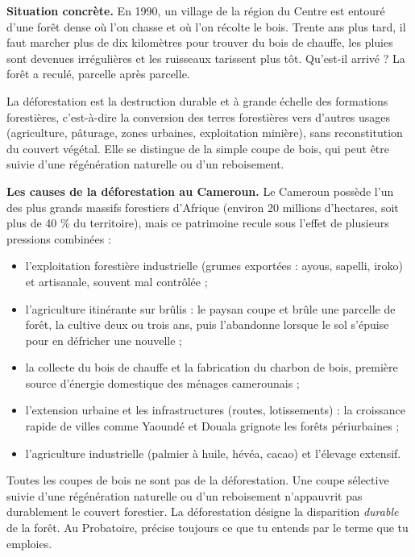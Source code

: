 \documentclass[11pt]{article}
\newcommand{\cle}[1]{{\popxbold\color{popdark}#1}}
\newcounter{popsec}
\newcounter{popsub}
\newcommand{\courssub}[1]{%
  \stepcounter{popsub}%
  \par\vspace{9pt}\noindent{\popxbold\fontsize{11.5}{13}\selectfont\color{popink}{\color{poporange}\thepopsec.\thepopsub}\hspace{6pt}#1}\par\nopagebreak\vspace{4pt}
}
\begin{document}
\courssub{Qu'est-ce que la déforestation ?}

\textbf{Situation concrète.} En 1990, un village de la région du Centre est entouré d'une forêt dense où l'on chasse et où l'on récolte le bois. Trente ans plus tard, il faut marcher plus de dix kilomètres pour trouver du bois de chauffe, les pluies sont devenues irrégulières et les ruisseaux tarissent plus tôt. Qu'est-il arrivé ? La forêt a reculé, parcelle après parcelle.

\begin{definition}[Déforestation]
La \cle{déforestation} est la destruction durable et à grande échelle des formations forestières, c'est-à-dire la conversion des terres forestières vers d'autres usages (agriculture, pâturage, zones urbaines, exploitation minière), sans reconstitution du couvert végétal. Elle se distingue de la simple coupe de bois, qui peut être suivie d'une régénération naturelle ou d'un reboisement.
\end{definition}

\textbf{Les causes de la déforestation au Cameroun.} Le Cameroun possède l'un des plus grands massifs forestiers d'Afrique (environ 20 millions d'hectares, soit plus de 40 \% du territoire), mais ce patrimoine recule sous l'effet de plusieurs pressions combinées :

\begin{itemize}
\item l'\cle{exploitation forestière} industrielle (grumes exportées : ayous, sapelli, iroko) et artisanale, souvent mal contrôlée ;
\item l'\cle{agriculture itinérante sur brûlis} : le paysan coupe et brûle une parcelle de forêt, la cultive deux ou trois ans, puis l'abandonne lorsque le sol s'épuise pour en défricher une nouvelle ;
\item la collecte du \cle{bois de chauffe} et la fabrication du charbon de bois, première source d'énergie domestique des ménages camerounais ;
\item l'\cle{extension urbaine} et les infrastructures (routes, lotissements) : la croissance rapide de villes comme Yaoundé et Douala grignote les forêts périurbaines ;
\item l'agriculture industrielle (palmier à huile, hévéa, cacao) et l'élevage extensif.
\end{itemize}

\begin{attention}
Toutes les coupes de bois ne sont pas de la déforestation. Une coupe sélective suivie d'une régénération naturelle ou d'un reboisement n'appauvrit pas durablement le couvert forestier. La déforestation désigne la disparition \emph{durable} de la forêt. Au Probatoire, précise toujours ce que tu entends par le terme que tu emploies.
\end{attention}
\end{document}
